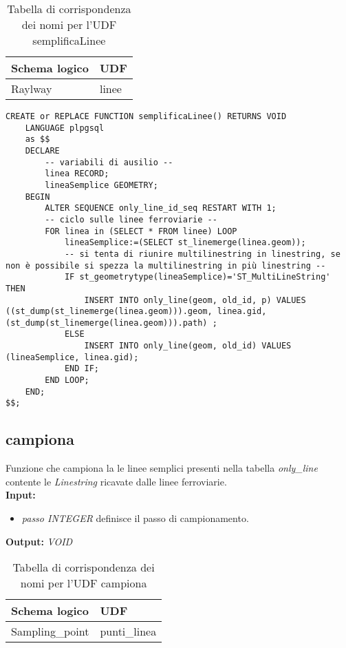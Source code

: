 \begin{table}[h]
\centering
\caption{Tabella di corrispondenza dei nomi per l'UDF semplificaLinee}
\label{mapTb4}
\begin{tabular}{|l|l|}
\hline
Schema logico       & UDF                \\ \hline
Raylway          & linee              \\ \hline
\end{tabular}
\end{table}

\begin{lstlisting}[style=mySQL]
CREATE or REPLACE FUNCTION semplificaLinee() RETURNS VOID
	LANGUAGE plpgsql
	as $$
	DECLARE
		-- variabili di ausilio --
		linea RECORD;
		lineaSemplice GEOMETRY;
	BEGIN
		ALTER SEQUENCE only_line_id_seq RESTART WITH 1;
		-- ciclo sulle linee ferroviarie --
		FOR linea in (SELECT * FROM linee) LOOP
			lineaSemplice:=(SELECT st_linemerge(linea.geom));
			-- si tenta di riunire multilinestring in linestring, se non è possibile si spezza la multilinestring in più linestring --
			IF st_geometrytype(lineaSemplice)='ST_MultiLineString' THEN
				INSERT INTO only_line(geom, old_id, p) VALUES ((st_dump(st_linemerge(linea.geom))).geom, linea.gid, (st_dump(st_linemerge(linea.geom))).path) ;
			ELSE
				INSERT INTO only_line(geom, old_id) VALUES (lineaSemplice, linea.gid);
			END IF;
		END LOOP;
	END;
$$;
\end{lstlisting}

\subsection{campiona}
Funzione che campiona la le linee semplici presenti nella tabella \textit{only\_line} contente le \textit{Linestring} ricavate dalle linee ferroviarie.\\
\textbf{Input:} 
\begin{itemize}
\item \textit{passo INTEGER} definisce il passo di campionamento.
\end{itemize}
\textbf{Output:} \textit{VOID} 

\begin{table}[h]
\centering
\caption{Tabella di corrispondenza dei nomi per l'UDF campiona}
\label{mapTb5}
\begin{tabular}{|l|l|}
\hline
Schema logico       & UDF                \\ \hline
Sampling\_point          & punti\_linea              \\ \hline
\end{tabular}
\end{table}

